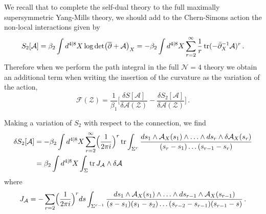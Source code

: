 \documentclass[12pt]{article}
\def \be  {\begin{equation}}
\def \ee  {\end{equation}}
\def \tr {\mathop{\rm tr}\nolimits}
\numberwithin{equation}{section}
\begin{document}
We recall that to complete the self-dual theory to the full maximally supersymmetric Yang-Mills theory, we should add to the Chern-Simons action the non-local interactions given by 
\be
S_2[\mathcal{A}] = \beta_2  \int d^{4|8} X \log \det\bigl(\overline{\partial} + \mathcal{A} \bigr)_X = -\beta_2 \int d^{4|8}X \sum_{r=2}^{\infty}\frac{1}{r}  
\tr (-\bar{\partial}_X^{-1} \mathcal{A})^r\,.
\ee
Therefore when we perform the path integral in the full $\mathcal{N}=4$ theory we obtain an additional term when writing the insertion of the curvature as the variation of the action,
\be
 \mathcal{F}(\mathcal{Z}) = \frac{1}{\beta_1} \biggl[
\frac{\delta S [\mathcal{A}]}{\delta \mathcal{A}(\mathcal{Z})}  - \frac{\delta S_2[\mathcal{A}]}{\delta \mathcal{A}(\mathcal{Z})}  \biggr]\,.
\ee

Making a variation of $S_2$ with respect to the connection, we find
\begin{align}
\delta S_2[\mathcal{A}] &= -\beta_2 \int d^{4|8}X \sum_{r=2}^{\infty} \Bigl( \frac{1}{2\pi i} \Bigr)^r \tr \int_{\Sigma^r} \frac{ds_1 \wedge \mathcal{A}_X(s_1) \wedge \ldots \wedge ds_{r} \wedge \delta \mathcal{A}_X(s_r)}{(s_r-s_1)\ldots(s_{r-1}-s_r)} \notag \\
&= \beta_2 \int d^{4|8}X \int_\Sigma \tr J_\mathcal{A} \wedge \delta \mathcal{A}
\end{align}
where
\be
J_{\mathcal{A}} = - \sum_{r=2} \Bigl(\frac{1}{2 \pi i}\Bigr)^r ds \int_{\Sigma^{r-1}} \frac{ds_1 \wedge \mathcal{A}_X(s_1) \wedge \ldots \wedge ds_{r-1} \wedge \mathcal{A}_X(s_{r-1})}{(s-s_1)(s_1-s_2)\ldots (s_{r-2}-s_{r-1})(s_{r-1}-s)}\,.
\label{JA}
\ee
\end{document}
